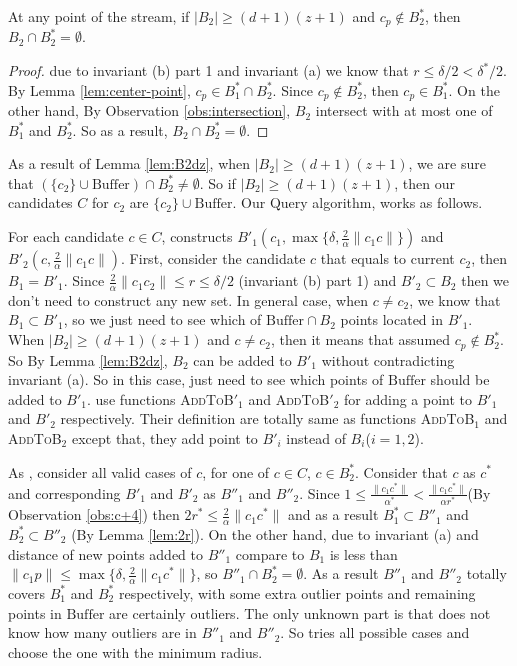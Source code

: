 \documentclass[envcountsame]{cls/cccg15}
\newcommand{\cp}{c_p}
\newcommand{\dz}{(d + 1)(z + 1)}
\newcommand{\Buffer}{\ensuremath{\text{Buffer}}}
\newcommand{\textproc}{\textsc}
\newcommand{\len}[1]{\|{#1}\|}
\newcommand{\radius}[1]{\frac{2}{\alpha} \len{c_1 #1}}
\newcommand{\lee}{\leqslant}
\newcommand{\gee}{\geqslant}
\renewcommand{\leq}{\lee}
\renewcommand{\geq}{\gee}
\renewcommand{\ge}{\gee}
\begin{document}
\begin{lemma}
\label{lem:B2dz}
	At any point of the stream, 
	if $|B_2| \ge \dz$ and $\cp \not\in B_2^*$,
	then $B_2 \cap B_2^* = \emptyset$.
\end{lemma}

\begin{proof}
	due to invariant (b) part 1 and invariant (a) we know that $r \leq \delta/2 < \delta^*/2$. 
	By Lemma \ref{lem:center-point}, $c_p \in B_1^* \cap B_2^*$. 
	Since $c_p \not \in B_2^*$, then $c_p \in B_1^*$. 
	On the other hand, By Observation \ref{obs:intersection}, $B_2$ intersect with at most one of $B_1^*$ and $B_2^*$. So as a result, $B_2 \cap B_2^* = \emptyset$.
\end{proof}

As a result of Lemma \ref{lem:B2dz}, when $|B_2| \geq \dz$, we are sure that $(\{c_2\} \cup \Buffer) \cap B_2^* \neq \emptyset$. 
So if $|B_2| \ge \dz$, then our candidates $C$ for $c_2$ are $\{c_2\} \cup \Buffer$. Our Query algorithm, works as follows. 

For each candidate $c \in C$,  constructs $B'_1(c_1, \max \{\delta, \radius{c} \})$ and $B'_2(c, \radius{c})$. 
First, consider the candidate $c$ that equals to current $c_2$, then $B_1 = B'_1$. 
Since $\radius{c_2} \leq r \leq \delta/2$ (invariant (b) part 1) and $B'_2 \subset B_2$ then we don't need to construct any new set. 
In general case, when $c \neq c_2$, we know that $B_1 \subset B'_1$, so we just need to see which of $\Buffer \cap B_2$ points located in $B'_1$.
When $|B_2| \geq \dz$ and $c \neq c_2$, then it means that assumed $c_p \not \in B_2^*$. So By Lemma \ref{lem:B2dz}, $B_2$ can be added to $B'_1$ without contradicting invariant (a). 
So in this case, just need to see which points of $\Buffer$ should be added to $B'_1$. 
 use functions \textproc{AddToB$'_1$} and \textproc{AddToB$'_2$} for adding a point to $B'_1$ and $B'_2$ respectively. 
Their definition are totally same as functions \textproc{AddToB$_1$} and \textproc{AddToB$_2$} except that, they add point to $B'_i$ instead of $B_i$($i = 1, 2$).

As , consider all valid cases of $c$, for one of $c \in C$, $c \in B_2^*$. 
Consider that $c$ as $c^*$ and corresponding $B'_1$ and $B'_2$ as $B''_1$ and $B''_2$. 
Since $1 \leq \frac{\len{c_1 c^*}}{\alpha^*} < \frac{\len {c_1 c^*}}{\alpha r^*}$(By Observation \ref{obs:c+4}) then $2r^* \leq \radius{c^*}$ and as a result $B^*_1 \subset B''_1$ and $B^*_2 \subset B''_2$ (By Lemma \ref{lem:2r}).
On the other hand, due to invariant (a) and distance of new points added to $B''_1$ compare to $B_1$ is less than $\len{c_1 p} \leq \max \{\delta, \radius{c^*} \}$, so $B''_1 \cap B_2^* = \emptyset$.
As a result $B''_1$ and $B''_2$ totally covers $B_1^*$  and $B_2^*$ respectively, with some extra outlier points and remaining points in $\Buffer$ are certainly outliers.
The only unknown part is that  does not know how many outliers are in $B''_1$ and $B''_2$.
So  tries all possible cases and choose the one with the minimum radius.
\end{document}
